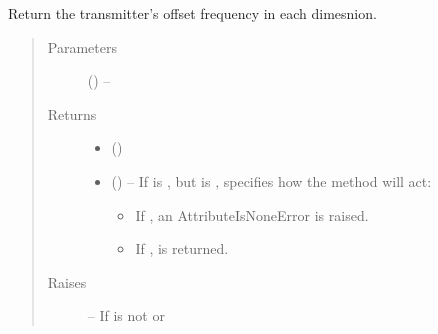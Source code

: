\documentclass[letterpaper,10pt,english]{sphinxmanual}
\begin{document}
\begin{fulllineitems}
\begin{fulllineitems}
\label{\detokenize{references/core:nmrespy.core.Estimator.get_offset}}
\sphinxAtStartPar
Return the transmitter’s offset frequency in each dimesnion.
\begin{quote}\begin{description}
\item[{Parameters}] \leavevmode
\sphinxAtStartPar
{} (\sphinxstyleliteralemphasis{\sphinxupquote{, }}) – 

\item[{Returns}] \leavevmode
\sphinxAtStartPar
\begin{itemize}
\item {} 
\sphinxAtStartPar
{} ()

\item {} 
\sphinxAtStartPar
{} () – If  is , but  is ,  specifies
how the method will act:
\begin{itemize}
\item {} 
\sphinxAtStartPar
If , an AttributeIsNoneError is raised.

\item {} 
\sphinxAtStartPar
If ,  is returned.

\end{itemize}

\end{itemize}


\item[{Raises}] \leavevmode
\sphinxAtStartPar
{\hyperref[\detokenize{references/errors:nmrespy._errors.InvalidUnitError}]{}} – If  is not  or 

\end{description}\end{quote}

\end{fulllineitems}
\end{fulllineitems}
\end{document}
